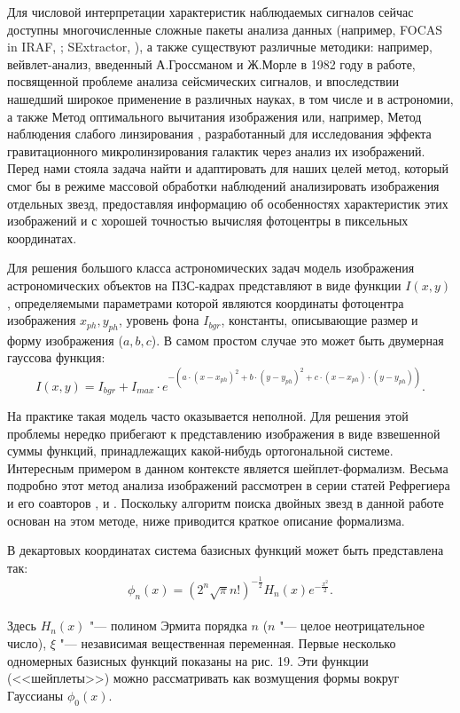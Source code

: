 Для числовой интерпретации характеристик наблюдаемых сигналов сейчас  доступны многочисленные сложные пакеты анализа данных (например,  FOCAS in IRAF, \cite{1981AJ.....86..476J}; SExtractor, \cite{1996A&AS..117..393B}), а также существуют различные методики: например, вейвлет-анализ, введенный А.Гроссманом и Ж.Морле в 1982 году в работе, посвященной проблеме анализа сейсмических сигналов, и впоследствии нашедший широкое применение в различных науках, в том числе и в астрономии, а также Метод оптимального вычитания изображения \cite{1998ApJ...503..325A}  или, например, Метод наблюдения слабого линзирования \cite{1995ApJ...449..460K}, разработанный для исследования эффекта гравитационного микролинзирования галактик через анализ их изображений. Перед нами стояла задача найти и адаптировать для наших целей метод, который смог бы в режиме массовой обработки наблюдений  анализировать изображения отдельных звезд, предоставляя информацию об особенностях характеристик этих изображений и с хорошей точностью вычисляя фотоцентры в пиксельных координатах.

Для решения большого класса астрономических задач модель изображения астрономических объектов на ПЗС-кадрах представляют в виде функции $I(x,y)$, определяемыми параметрами которой являются координаты фотоцентра изображения $x_{ph},y_{ph}$, уровень фона $I_{bgr}$, константы, описывающие размер и форму изображения ($a,b,c$). В самом простом случае это может быть двумерная гауссова функция:
 \begin{equation}
 \label{eq:ShI}
 I(x,y) = I_{bgr}+I_{max}\cdot e^{-(a\cdot(x-x_{ph})^2+b\cdot(y-y_{ph})^2+c\cdot(x-x_{ph})\cdot(y-y_{ph}))}.
 \end{equation}
 
На практике такая модель часто оказывается неполной. Для решения этой проблемы нередко прибегают к представлению изображения в виде взвешенной суммы функций, принадлежащих какой-нибудь ортогональной системе. Интересным примером в данном контексте является шейплет-формализм. Весьма подробно этот метод анализа изображений рассмотрен в серии статей Рефрегиера и его соавторов \cite{2003MNRAS.338...35R}, \cite{2003MNRAS.338...48R} и \cite{2005MNRAS.363..197M}. Поскольку алгоритм поиска двойных звезд в данной работе основан на этом методе, ниже приводится краткое описание формализма.

В декартовых координатах система базисных функций может быть представлена так:\\
\begin{equation}
\label{eq:ShBasis}
\phi_n(x) = \left(2^n\sqrt{\pi}n!\right)^{-\frac{1}{2}}H_n(x)e^{-\frac{x^2}{2}}.
\end{equation}
\\Здесь $H_n(x)$ "--- полином Эрмита порядка $n$ ($n$ "--- целое неотрицательное число), $\xi$ "--- независимая вещественная переменная.
Первые несколько одномерных базисных функций показаны на рис. 19. Эти функции (<<шейплеты>>) можно рассматривать как возмущения формы вокруг Гауссианы $\phi_0(x)$.

